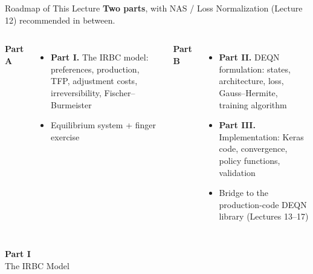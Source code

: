 \documentclass[aspectratio=169,11pt]{beamer}
\begin{document}
\begin{frame}{Roadmap of This Lecture}
\textbf{Two parts}, with NAS / Loss Normalization (Lecture 12) recommended in between.

\vspace{0.4em}
\begin{columns}[T]
\textbf{Part A}
\begin{itemize}
    \item \textbf{Part I.} The IRBC model: preferences, production, TFP, adjustment costs, irreversibility, Fischer--Burmeister
    \item Equilibrium system + finger exercise
\end{itemize}

\textbf{Part B}
\begin{itemize}
    \item \textbf{Part II.} DEQN formulation: states, architecture, loss, Gauss--Hermite, training algorithm
    \item \textbf{Part III.} Implementation: Keras code, convergence, policy functions, validation
    \item Bridge to the production-code DEQN library (Lectures 13--17)
\end{itemize}
\end{columns}
\end{frame}


\begin{frame}{}
\vfill
\begin{center}
{\Huge \textcolor{uzhblue}{\textbf{Part I}}}\\[12pt]
{\LARGE The IRBC Model}
\end{center}
\vfill
\end{frame}
\end{document}
